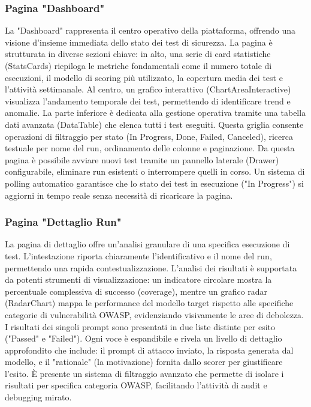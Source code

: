\subsubsection{Pagina "Dashboard"} 
La "Dashboard" rappresenta il centro operativo della piattaforma, offrendo una visione d'insieme immediata dello stato dei test di sicurezza. La pagina è strutturata in diverse sezioni chiave: in alto, una serie di card statistiche (StatsCards) riepiloga le metriche fondamentali come il numero totale di esecuzioni, il modello di scoring più utilizzato, la copertura media dei test e l'attività settimanale. Al centro, un grafico interattivo (ChartAreaInteractive) visualizza l'andamento temporale dei test, permettendo di identificare trend e anomalie.
La parte inferiore è dedicata alla gestione operativa tramite una tabella dati avanzata (DataTable) che elenca tutti i test eseguiti. Questa griglia consente operazioni di filtraggio per stato (In Progress, Done, Failed, Canceled), ricerca testuale per nome del run, ordinamento delle colonne e paginazione. Da questa pagina è possibile avviare nuovi test tramite un pannello laterale (Drawer) configurabile, eliminare run esistenti o interrompere quelli in corso. Un sistema di polling automatico garantisce che lo stato dei test in esecuzione ("In Progress") si aggiorni in tempo reale senza necessità di ricaricare la pagina.

\subsubsection{Pagina "Dettaglio Run"}
La pagina di dettaglio offre un'analisi granulare di una specifica esecuzione di test. L'intestazione riporta chiaramente l'identificativo e il nome del run, permettendo una rapida contestualizzazione.
L'analisi dei risultati è supportata da potenti strumenti di visualizzazione: un indicatore circolare mostra la percentuale complessiva di successo (coverage), mentre un grafico radar (RadarChart) mappa le performance del modello target rispetto alle specifiche categorie di vulnerabilità OWASP, evidenziando visivamente le aree di debolezza.
I risultati dei singoli prompt sono presentati in due liste distinte per esito ("Passed" e "Failed"). Ogni voce è espandibile e rivela un livello di dettaglio approfondito che include: il prompt di attacco inviato, la risposta generata dal modello, e il "rationale" (la motivazione) fornita dallo scorer per giustificare l'esito. È presente un sistema di filtraggio avanzato che permette di isolare i risultati per specifica categoria OWASP, facilitando l'attività di audit e debugging mirato.

